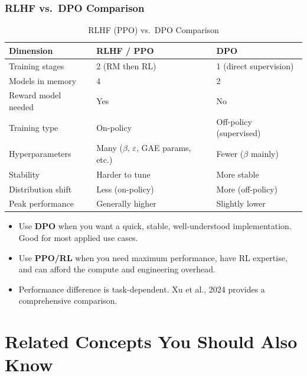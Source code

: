 \documentclass[11pt, a4paper]{article}
\begin{document}
\subsubsection{RLHF vs.\ DPO Comparison}

\begin{table}[h]
\centering
\caption{RLHF (PPO) vs.\ DPO Comparison}
\begin{tabular}{@{}p{4cm}p{4cm}p{5cm}@{}}
\toprule
\textbf{Dimension} & \textbf{RLHF / PPO} & \textbf{DPO} \\
\midrule
Training stages & 2 (RM then RL) & 1 (direct supervision) \\
Models in memory & 4 & 2 \\
Reward model needed & Yes & No \\
Training type & On-policy & Off-policy (supervised) \\
Hyperparameters & Many ($\beta$, $\varepsilon$, GAE params, etc.) & Fewer ($\beta$ mainly) \\
Stability & Harder to tune & More stable \\
Distribution shift & Less (on-policy) & More (off-policy) \\
Peak performance & Generally higher & Slightly lower \\
\bottomrule
\end{tabular}
\end{table}

\begin{notebox}
\begin{itemize}[leftmargin=1.5em]
  \item Use \textbf{DPO} when you want a quick, stable, well-understood implementation. Good for most applied use cases.
  \item Use \textbf{PPO/RL} when you need maximum performance, have RL expertise, and can afford the compute and engineering overhead.
  \item Performance difference is task-dependent. Xu et al., 2024 provides a comprehensive comparison.
\end{itemize}
\end{notebox}

\newpage
\section{Related Concepts You Should Also Know}
\end{document}
